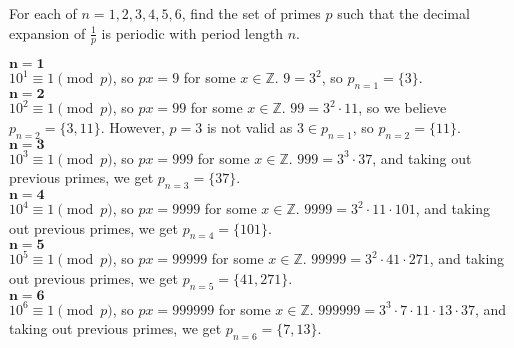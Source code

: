 \documentclass{article}
\begin{document}
\begin{problem}{}{}
    For each of $n=1,2,3,4,5,6$, find the set of primes $p$ such that the decimal expansion of $\frac{1}{p}$ is periodic with period length $n$.
\end{problem}
\begin{solution}{}{}
    $\boldsymbol{n=1}$\\
    $10^1\equiv1\pmod{p}$, so $px=9$ for some $x\in\mathbb{Z}$. $9=3^2$, so $p_{n=1}=\{3\}$. \\
    $\boldsymbol{n=2}$\\
    $10^2\equiv1\pmod{p}$, so $px=99$ for some $x\in\mathbb{Z}$. $99=3^2\cdot11$, so we believe $p_{n=2}=\{3,11\}$. However, $p=3$ is not valid as $3\in p_{n=1}$, so $p_{n=2}=\{11\}$. \\
    $\boldsymbol{n=3}$\\
    $10^3\equiv1\pmod{p}$, so $px=999$ for some $x\in\mathbb{Z}$. $999=3^3\cdot37$, and taking out previous primes, we get $p_{n=3}=\{37\}$. \\
    $\boldsymbol{n=4}$\\
    $10^4\equiv1\pmod{p}$, so $px=9999$ for some $x\in\mathbb{Z}$. $9999=3^2\cdot11\cdot101$, and taking out previous primes, we get $p_{n=4}=\{101\}$. \\
    $\boldsymbol{n=5}$\\
    $10^5\equiv1\pmod{p}$, so $px=99999$ for some $x\in\mathbb{Z}$. $99999=3^2\cdot41\cdot271$, and taking out previous primes, we get $p_{n=5}=\{41,271\}$. \\
    $\boldsymbol{n=6}$\\
    $10^6\equiv1\pmod{p}$, so $px=999999$ for some $x\in\mathbb{Z}$. $999999=3^3\cdot7\cdot11\cdot13\cdot37$, and taking out previous primes, we get $p_{n=6}=\{7,13\}$.
\end{solution}
\end{document}
